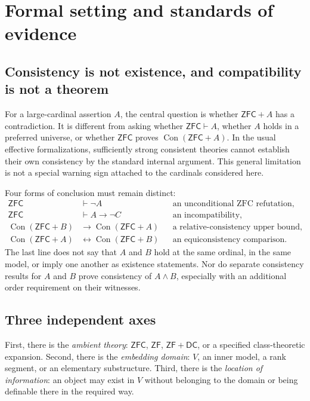\documentclass[11pt,letterpaper]{article}
\theoremstyle{definition}
\newcommand{\ZFC}{\mathsf{ZFC}}
\newcommand{\ZF}{\mathsf{ZF}}
\newcommand{\DC}{\mathsf{DC}}
\newcommand{\Con}{\operatorname{Con}}
\begin{document}
\section{Formal setting and standards of evidence}\label{sec:formal}

\subsection{Consistency is not existence, and compatibility is not a theorem}

For a large-cardinal assertion $A$, the central question is whether $\ZFC+A$ has a contradiction. It is different from asking whether $\ZFC\vdash A$, whether $A$ holds in a preferred universe, or whether $\ZFC$ proves $\Con(\ZFC+A)$. In the usual effective formalizations, sufficiently strong consistent theories cannot establish their own consistency by the standard internal argument. This general limitation is not a special warning sign attached to the cardinals considered here. \cite{godel}

Four forms of conclusion must remain distinct:
\begin{align*}
\ZFC&\vdash\neg A &&\text{an unconditional ZFC refutation},\\
\ZFC&\vdash A\longrightarrow\neg C &&\text{an incompatibility},\\
\Con(\ZFC+B)&\longrightarrow\Con(\ZFC+A)
 &&\text{a relative-consistency upper bound},\\
\Con(\ZFC+A)&\longleftrightarrow\Con(\ZFC+B)
 &&\text{an equiconsistency comparison}.
\end{align*}
The last line does not say that $A$ and $B$ hold at the same ordinal, in the same model, or imply one another as existence statements. Nor do separate consistency results for $A$ and $B$ prove consistency of $A\wedge B$, especially with an additional order requirement on their witnesses.

\subsection{Three independent axes}

First, there is the \emph{ambient theory}: $\ZFC$, $\ZF$, $\ZF+\DC$, or a specified class-theoretic expansion. Second, there is the \emph{embedding domain}: $V$, an inner model, a rank segment, or an elementary substructure. Third, there is the \emph{location of information}: an object may exist in $V$ without belonging to the domain or being definable there in the required way.
\end{document}
